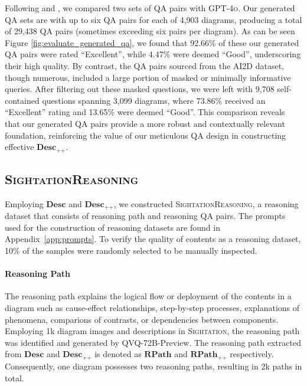 Following \citet{chen2023alpagasus} and \citet{xu2024magpie}, we compared two sets of QA pairs with \textsc{GPT-4o}. Our generated QA sets are with up to six QA pairs for each of 4,903 diagrams, producing a total of 29,438 QA pairs (sometimes exceeding six pairs per diagram). As can be seen Figure \ref{fig:evaluate_generated_qa},  we found that 92.66\% of these our generated QA pairs were rated ``Excellent'', while 4.47\% were deemed ``Good'', underscoring their high quality. By contrast, the QA pairs sourced from the AI2D dataset, though numerous, included a large portion of masked or minimally informative queries. After filtering out these masked questions, we were left with 9,708 self-contained questions spanning 3,099 diagrams, where 73.86\% received an ``Excellent'' rating and 13.65\% were deemed ``Good''. This comparison reveals that our generated QA pairs provide a more robust and contextually relevant foundation, reinforcing the value of our meticulous QA design in constructing effective $\textbf{Desc}_{\texttt{++}}$.


\subsection{\textsc{SightationReasoning}}
Employing $\textbf{Desc}$ and $\textbf{Desc}_{\texttt{++}}$, we constructed \textsc{SightationReasoning}, a reasoning dataset that consists of reasoning path and reasoning QA pairs. The prompts used for the construction of reasoning datasets are found in Appendix~\ref{app:prompts}. To verify the quality of contents as a reasoning dataset, 10\% of the samples were randomly selected to be manually inspected.

\paragraph{Reasoning Path} The reasoning path explains the logical flow or deployment of the contents in a diagram such as cause-effect relationships, step-by-step processes, explanations of phenomena, comparions of contrasts, or dependencies between components. Employing 1k diagram images and descriptions in \textsc{Sightation}, the reasoning path was identified and generated by QVQ-72B-Preview. The reasoning path extracted from $\textbf{Desc}$ and $\textbf{Desc}_{\texttt{++}}$ is denoted as $\textbf{RPath}$ and $\textbf{RPath}_{\texttt{++}}$ respectively. Consequently, one diagram possesses two reasoning paths, resulting in 2k paths in total. 

